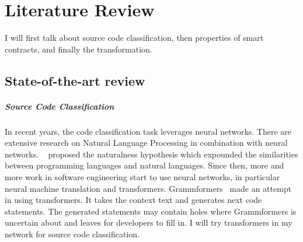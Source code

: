 \chapter{Literature Review}
\label{sec:literature-review}


I will first talk about source code classification, then properties of smart contracts, and finally the transformation.

\section{State-of-the-art review}

\paragraph*{Source Code Classification}
In recent years, the code classification task leverages neural networks.
There are extensive research on Natural Language Processing in combination with neural networks. ~\cite{allamanis2018survey} proposed the naturalness hypothesis which expounded the similarities between programming languages and natural languages. Since then, more and more work in software engineering start to use neural networks, in particular neural machine translation and transformers.
Grammformers~\cite{guo2021learning} made an attempt in using transformers. It takes the context text and generates next code statements. The generated statements may contain holes where Grammformers is uncertain about and leaves for developers to fill in.
I will try transformers in my network for source code classification.

